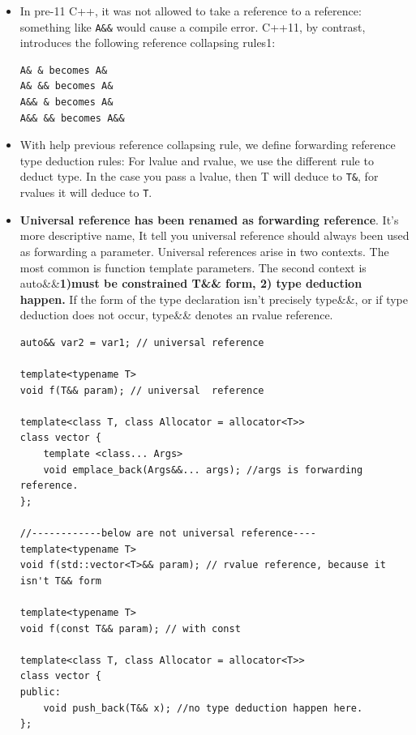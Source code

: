 \documentclass[a4paper,11pt,twoside]{book}
\begin{document}
\begin{itemize}
	\item In pre-11 C++, it was not allowed to take a reference to a reference: something like \texttt{A\&\&} would cause a compile error. C++11, by contrast, introduces the following reference collapsing rules1:
	
\begin{lstlisting}[numbers=none]
A& & becomes A&
A& && becomes A&
A&& & becomes A&
A&& && becomes A&&
\end{lstlisting}
	
	\item With help previous reference collapsing rule, we define forwarding reference type deduction rules: For lvalue and rvalue, we use the different rule to deduct type. In the case you pass a lvalue, then T will deduce to \texttt{T\&}, for rvalues it will deduce to \texttt{T}.


    \item \textbf{Universal reference has been renamed as forwarding reference}. It's more descriptive name, It tell you universal reference should always been used as forwarding a parameter. Universal references arise in two contexts. The most common is function template parameters. The second context is auto\&\&\textbf{1)must be constrained T\&\& form, 2) type deduction happen.} If the form of the type declaration isn't precisely type\&\&, or if type deduction does not occur, type\&\& denotes an rvalue reference.
\begin{lstlisting}
auto&& var2 = var1; // universal reference

template<typename T>
void f(T&& param); // universal  reference

template<class T, class Allocator = allocator<T>>
class vector {
	template <class... Args>
	void emplace_back(Args&&... args); //args is forwarding reference. 
};

//------------below are not universal reference----
template<typename T>
void f(std::vector<T>&& param); // rvalue reference, because it isn't T&& form

template<typename T>
void f(const T&& param); // with const

template<class T, class Allocator = allocator<T>>
class vector { 
public:
	void push_back(T&& x); //no type deduction happen here.
};
\end{lstlisting}


\end{itemize}
\end{document}
